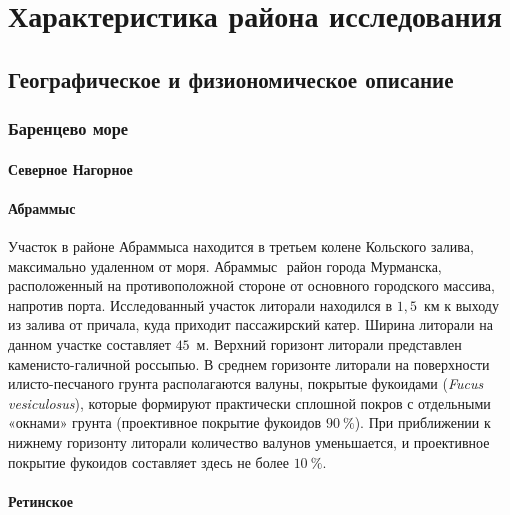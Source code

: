 \documentclass[12pt, a4paper]{disser}
\begin{document}
    \section{Характеристика района исследования}
        \subsection{Географическое и физиономическое описание}
            \subsubsection{Баренцево море}

            \paragraph{Северное Нагорное}

            \paragraph{Абрам­мыс}
Участок  в районе  Абрам­мыса  находится в третьем колене Кольского залива, максимально  удаленном   от   моря. 
Абрам­мыс     ­   район   города   Мурманска,   расположенный   на противоположной стороне от основного городского массива, напротив порта. 
Исследованный участок   литорали   находился   в   $1,5$~км   к   выходу   из   залива   от   причала,   куда   приходит пассажирский катер. 
Ширина   литорали   на   данном   участке   составляет   $45$~м.   
Верхний   горизонт   литорали представлен  каменисто-галичной  россыпью. 
В среднем  горизонте литорали на поверхности илисто-песчаного   грунта   располагаются   валуны,   покрытые   фукоидами   ({\it Fucus  vesiculosus}), которые   формируют   практически   сплошной   покров   с   отдельными   «окнами»   грунта (проективное  покрытие фукоидов $90~\%$).  
При приближении  к нижнему горизонту литорали количество   валунов   уменьшается,   и   проективное   покрытие   фукоидов   составляет   здесь   не более $10~\%$.

    \paragraph{Ретинское}
\end{document}
